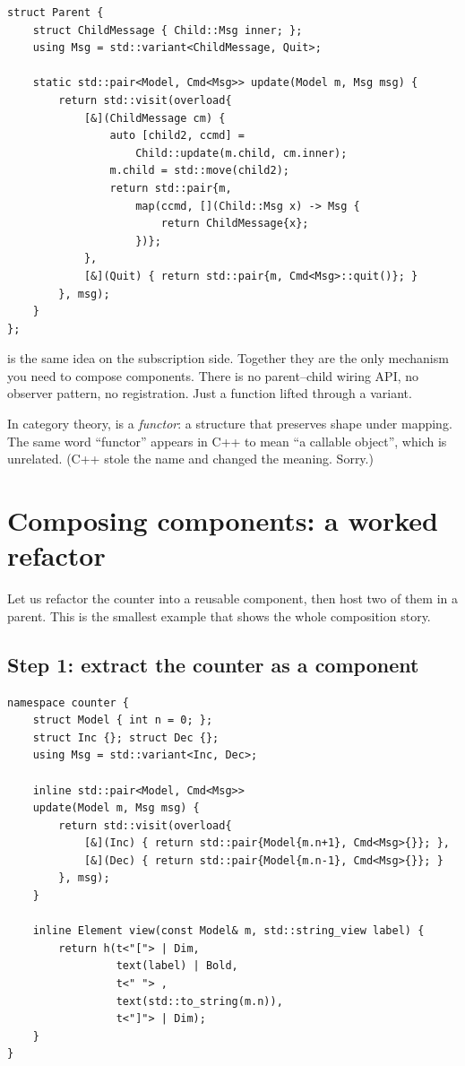 \begin{lstlisting}
struct Parent {
    struct ChildMessage { Child::Msg inner; };
    using Msg = std::variant<ChildMessage, Quit>;

    static std::pair<Model, Cmd<Msg>> update(Model m, Msg msg) {
        return std::visit(overload{
            [&](ChildMessage cm) {
                auto [child2, ccmd] =
                    Child::update(m.child, cm.inner);
                m.child = std::move(child2);
                return std::pair{m,
                    map(ccmd, [](Child::Msg x) -> Msg {
                        return ChildMessage{x};
                    })};
            },
            [&](Quit) { return std::pair{m, Cmd<Msg>::quit()}; }
        }, msg);
    }
};
\end{lstlisting}

 is the same idea on the subscription side. Together
they are the only mechanism you need to compose components. There
is no parent--child wiring API, no observer pattern, no
registration. Just a function lifted through a variant.

\begin{funfact}
In category theory,  is a \emph{functor}: a structure
that preserves shape under mapping. The same word ``functor''
appears in C++ to mean ``a callable object'', which is unrelated.
(C++ stole the name and changed the meaning. Sorry.)
\end{funfact}

\section{Composing components: a worked refactor}

Let us refactor the counter into a reusable component, then host
two of them in a parent. This is the smallest example that shows
the whole composition story.

\subsection*{Step 1: extract the counter as a component}

\begin{lstlisting}
namespace counter {
    struct Model { int n = 0; };
    struct Inc {}; struct Dec {};
    using Msg = std::variant<Inc, Dec>;

    inline std::pair<Model, Cmd<Msg>>
    update(Model m, Msg msg) {
        return std::visit(overload{
            [&](Inc) { return std::pair{Model{m.n+1}, Cmd<Msg>{}}; },
            [&](Dec) { return std::pair{Model{m.n-1}, Cmd<Msg>{}}; }
        }, msg);
    }

    inline Element view(const Model& m, std::string_view label) {
        return h(t<"["> | Dim,
                 text(label) | Bold,
                 t<" "> ,
                 text(std::to_string(m.n)),
                 t<"]"> | Dim);
    }
}
\end{lstlisting}

